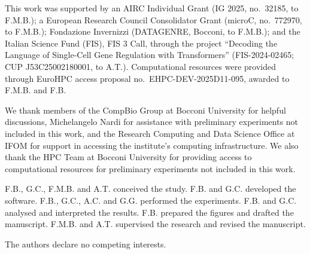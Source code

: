 \documentclass[pdflatex,sn-nature]{sn-jnl}%
\theoremstyle{thmstyleone}%
\theoremstyle{thmstyletwo}%
\theoremstyle{thmstylethree}%
\begin{document}





This work was supported by an AIRC Individual Grant (IG 2025, no.~32185, to F.M.B.); a European Research Council Consolidator Grant (microC, no.~772970, to F.M.B.); Fondazione Invernizzi (DATAGENRE, Bocconi, to F.M.B.); and the Italian Science Fund (FIS), FIS 3 Call, through the project ``Decoding the Language of Single-Cell Gene Regulation with Transformers'' (FIS-2024-02465; CUP J53C25002180001, to A.T.).
Computational resources were provided through EuroHPC access proposal no.~EHPC-DEV-2025D11-095, awarded to F.M.B. and F.B.


We thank members of the CompBio Group at Bocconi University for helpful discussions, Michelangelo Nardi for assistance with preliminary experiments not included in this work, and the Research Computing and Data Science Office at IFOM for support in accessing the institute's computing infrastructure.
We also thank the HPC Team at Bocconi University for providing access to computational resources for preliminary experiments not included in this work.


F.B., G.C., F.M.B. and A.T. conceived the study.
F.B. and G.C. developed the software.
F.B., G.C., A.C. and G.G. performed the experiments.
F.B. and G.C. analysed and interpreted the results.
F.B. prepared the figures and drafted the manuscript.
F.M.B. and A.T. supervised the research and revised the manuscript.


The authors declare no competing interests.

\clearpage
\end{document}
